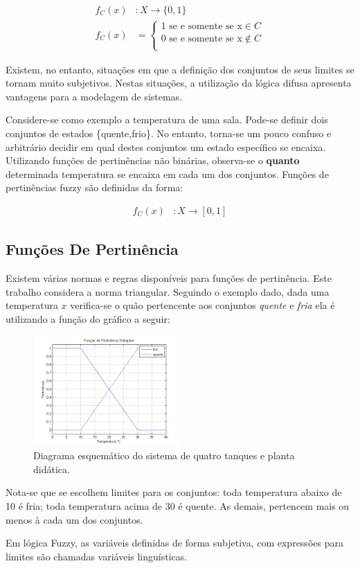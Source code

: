 \begin{align*}
f_{C}(x)&:X \rightarrow \{0,1\} \quad \\
f_{C}(x)&= 
\begin{cases}
1 \text{ se e somente se x} \in C \\
0 \text{ se e somente se x} \notin C\\
\end{cases}
\end{align*}

Existem, no entanto, situações em que a definição dos conjuntos de seus limites se tornam muito subjetivos. Nestas situações, a utilização da lógica difusa apresenta vantagens para a modelagem de sistemas. 

Considere-se como exemplo a temperatura de uma sala. Pode-se definir dois conjuntos de estados \{quente,frio\}. No entanto, torna-se um pouco confuso e arbitrário decidir em qual destes conjuntos um estado específico se encaixa. Utilizando funções de pertinências não binárias, observa-se o \textbf{quanto} determinada temperatura se encaixa em cada um dos conjuntos. Funções de pertinências fuzzy são definidas da forma:

\begin{align*}
f_{C}(x)&:X \rightarrow [0,1]
\end{align*}

\subsection{Funções De Pertinência}
Existem várias normas e regras disponíveis para funções de pertinência. Este trabalho considera a norma triangular. Seguindo o exemplo dado, dada uma temperatura $x$ verifica-se o quão pertencente aos conjuntos \textit{quente} e \textit{fria} ela é utilizando a função do gráfico a seguir:

\begin{figure}[H]
	\includegraphics[width=0.5\textwidth]{img/pertinencia.png}
	\caption{Diagrama esquemático do sistema de quatro tanques e planta didática.}
	\label{figPertinencia}
\end{figure}

Nota-se que se escolhem limites para os conjuntos: toda temperatura abaixo de 10 é fria; toda temperatura acima de 30 é quente. As demais, pertencem mais ou menos à cada um dos conjuntos.

Em lógica Fuzzy, as variáveis definidas de forma subjetiva, com expressões para limites são chamadas variáveis linguísticas.




%

